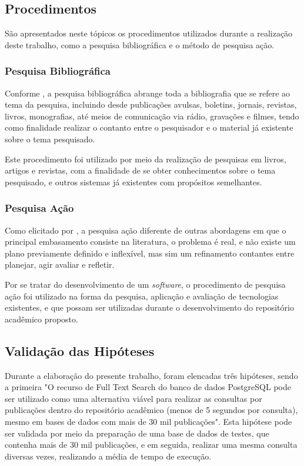 \subsection{Procedimentos}

São apresentados neste tópicos os procedimentos utilizados
durante a realização deste trabalho, como a pesquisa bibliográfica e
o método de pesquisa ação.

\subsubsection{Pesquisa Bibliográfica}

Conforme \citep[p. 183]{LAKATOS2003:metodologia}, a pesquisa bibliográfica
abrange toda a bibliografia que se refere ao tema da pesquisa,
incluindo desde publicações avulsas, boletins, jornais, revistas,
livros, monografias, até meios de comunicação via rádio,
gravações e filmes, tendo como finalidade realizar o contanto
entre o pesquisador e o material já existente sobre o tema pesquisado.

Este procedimento foi utilizado por meio da realização de pesquisas
em livros, artigos e revistas, com a finalidade de se obter
conhecimentos sobre o tema pesquisado, e outros sistemas
já existentes com propósitos semelhantes.

\subsubsection{Pesquisa Ação}

Como elicitado por \citep[p. 45]{LOVATO:metodologia}, a pesquisa ação
diferente de outras abordagens em que o principal
embasamento consiste na literatura, o problema é real, e não existe
um plano previamente definido e inflexível, mas sim um refinamento
contantes entre planejar, agir avaliar e refletir.

Por se tratar do desenvolvimento de um \emph{software}, o procedimento
de pesquisa ação foi utilizado na forma da pesquisa,
aplicação e avaliação de tecnologias existentes, e que possam
ser utilizadas durante o desenvolvimento do repositório
acadêmico proposto.

\subsection{Validação das Hipóteses}

Durante a elaboração do presente trabalho, foram elencadas
três hipóteses, sendo a  primeira "O recurso de Full Text
Search do banco de dados PostgreSQL pode ser utilizado como
uma alternativa viável para realizar as consultas por publicações
dentro do repositório acadêmico (menos de 5 segundos por consulta),
mesmo em bases de dados com mais de 30 mil publicações".
Esta hipótese pode ser validada por meio da preparação de uma base
de dados de testes, que contenha mais de 30 mil publicações, e
em seguida, realizar uma mesma consulta diversas vezes, realizando
a média de tempo de execução.


